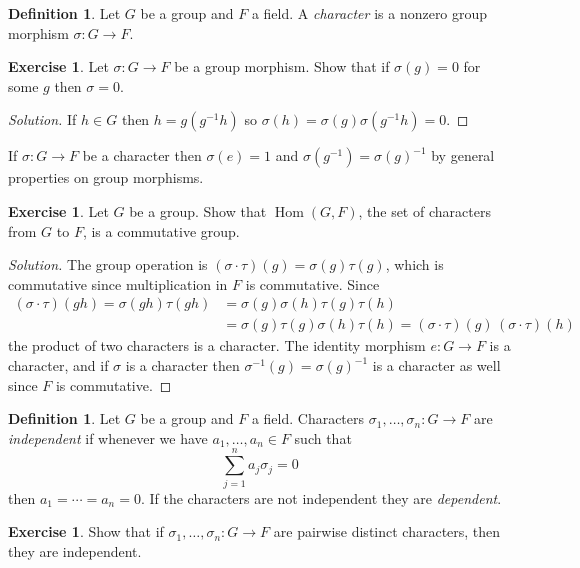 \documentclass[11pt]{amsart}
\theoremstyle{definition}
\newtheorem{defi}[theo]{Definition}
\newtheorem{e}[theo]{Exercise}
\newenvironment{s}{\begin{proof}[Solution]}{\end{proof}}
\DeclareMathOperator{\Hom}{Hom}
\begin{document}
\begin{defi}
Let $G$ be a group and $F$ a field.
A \emph{character} is a nonzero group morphism $\sigma : G \to F$.
\end{defi}

\begin{e}
Let $\sigma : G \to F$ be a group morphism.
Show that if $\sigma(g) = 0$ for some $g$ then $\sigma = 0$.
\end{e}

\begin{s}
If $h \in G$ then $h = g (g^{-1}h)$ so $\sigma(h) = \sigma(g) \sigma(g^{-1}h) = 0$.
\end{s}

If $\sigma : G \to F$ be a character then $\sigma(e) = 1$ and $\sigma(g^{-1}) = \sigma(g)^{-1}$ by general properties on group morphisms.


\begin{e}
Let $G$ be a group.
Show that $\Hom(G, F)$, the set of characters from $G$ to $F$, is a commutative group.
\end{e}

\begin{s}
The group operation is $(\sigma \cdot \tau)(g) = \sigma(g) \tau(g)$, which is commutative since multiplication in $F$ is commutative.
Since
\begin{align*}
(\sigma\cdot\tau)(gh)
= \sigma(gh) \tau(gh)
&= \sigma(g) \sigma(h) \tau(g) \tau(h)
\\
&= \sigma(g) \tau(g) \sigma(h) \tau(h)
= (\sigma\cdot\tau)(g) \, (\sigma\cdot\tau)(h)
\end{align*}
the product of two characters is a character.
The identity morphism $e : G \to F$ is a character, and if $\sigma$ is a character then $\sigma^{-1}(g) = \sigma(g)^{-1}$ is a character as well since $F$ is commutative.
\end{s}


\begin{defi}
Let $G$ be a group and $F$ a field.
Characters $\sigma_1, \ldots, \sigma_n : G \to F$ are \emph{independent} if whenever we have $a_1, \ldots, a_n \in F$ such that
\[
\sum_{j=1}^n a_j \sigma_j = 0
\]
then $a_1 = \cdots = a_n = 0$.
If the characters are not independent they are \emph{dependent}.
\end{defi}



\begin{e}
Show that if $\sigma_1, \ldots, \sigma_n : G \to F$ are pairwise distinct characters, then they are independent.
\end{e}
\end{document}
